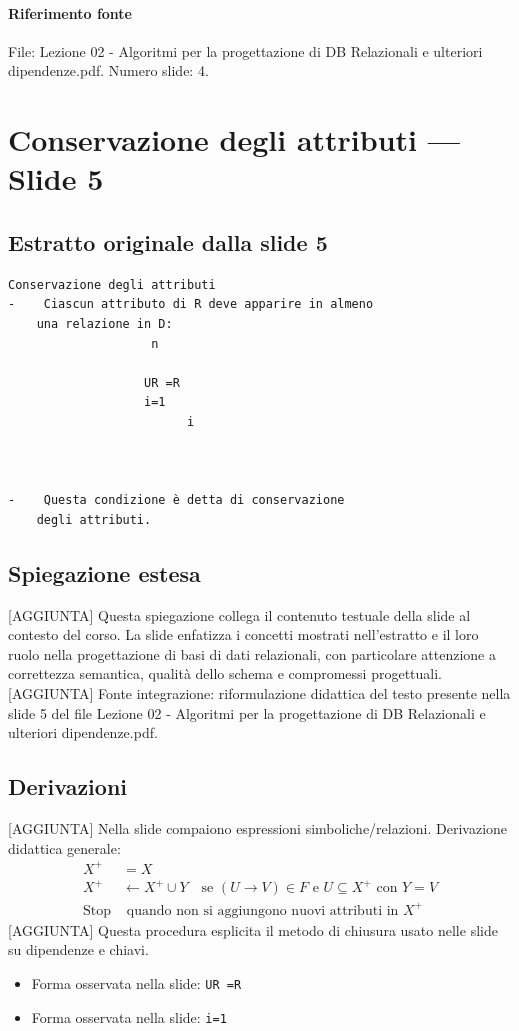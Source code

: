 \documentclass[11pt]{article}
\begin{document}
\paragraph{Riferimento fonte} File: Lezione 02 - Algoritmi per la progettazione di DB Relazionali e ulteriori dipendenze.pdf. Numero slide: 4.
\section{Conservazione degli attributi --- Slide 5}
\subsection*{Estratto originale dalla slide 5}
\begin{lstlisting}
Conservazione degli attributi
-    Ciascun attributo di R deve apparire in almeno
    una relazione in D:
                    n

                   UR =R
                   i=1
                         i



-    Questa condizione è detta di conservazione
    degli attributi.
\end{lstlisting}
\subsection*{Spiegazione estesa}
[AGGIUNTA] Questa spiegazione collega il contenuto testuale della slide al contesto del corso. La slide enfatizza i concetti mostrati nell'estratto e il loro ruolo nella progettazione di basi di dati relazionali, con particolare attenzione a correttezza semantica, qualità dello schema e compromessi progettuali.
[AGGIUNTA] Fonte integrazione: riformulazione didattica del testo presente nella slide 5 del file Lezione 02 - Algoritmi per la progettazione di DB Relazionali e ulteriori dipendenze.pdf.
\subsection*{Derivazioni}
[AGGIUNTA] Nella slide compaiono espressioni simboliche/relazioni. Derivazione didattica generale:
\begin{align*}
X^+ &= X \\
X^+ &\leftarrow X^+ \cup Y \quad \text{se } (U \to V) \in F \text{ e } U \subseteq X^+ \text{ con } Y=V \\
\text{Stop} &\text{ quando non si aggiungono nuovi attributi in } X^+
\end{align*}
[AGGIUNTA] Questa procedura esplicita il metodo di chiusura usato nelle slide su dipendenze e chiavi.
\begin{itemize}[leftmargin=*]
\item Forma osservata nella slide: \texttt{UR =R}
\item Forma osservata nella slide: \texttt{i=1}
\end{itemize}
\end{document}
